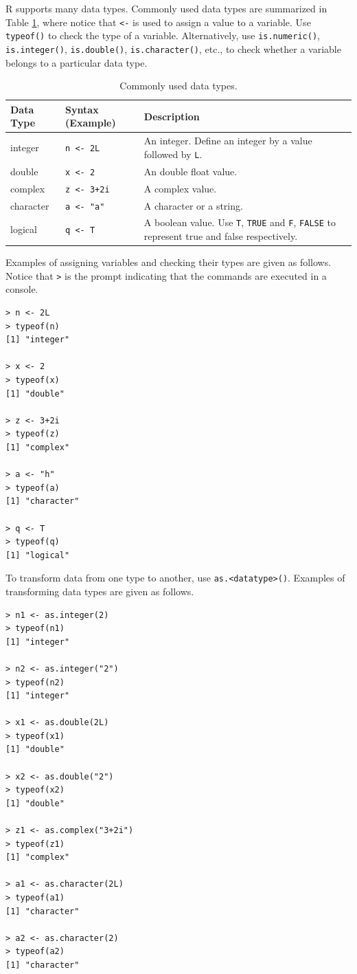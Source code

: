 R supports many data types. Commonly used data types are summarized in Table \ref{ch:r1:tab:datatype}, where notice that \verb|<-| is used to assign a value to a variable. Use \verb|typeof()| to check the type of a variable. Alternatively, use \verb|is.numeric()|, \verb|is.integer()|, \verb|is.double()|, \verb|is.character()|, etc., to check whether a variable belongs to a particular data type.
\begin{table}
  \centering \caption{Commonly used data types.}\label{ch:r1:tab:datatype}
  \begin{tabularx}{\textwidth}{llX}
    \hline
    Data Type & Syntax (Example) & Description \\ \hline
    integer & \verb|n <- 2L| & An integer. Define an integer by a value followed by \verb|L|. \\
    double & \verb|x <- 2| & An double float value. \\
    complex & \verb|z <- 3+2i| & A complex value. \\
    character & \verb|a <- "a"| & A character or a string. \\
    logical & \verb|q <- T| & A boolean value. Use \verb|T|, \verb|TRUE| and \verb|F|, \verb|FALSE| to represent true and false respectively. \\
    \hline
  \end{tabularx}
\end{table}

Examples of assigning variables and checking their types are given as follows. Notice that \verb|>| is the prompt indicating that the commands are executed in a console.
\begin{lstlisting}
> n <- 2L
> typeof(n)
[1] "integer"

> x <- 2
> typeof(x)
[1] "double"

> z <- 3+2i
> typeof(z)
[1] "complex"

> a <- "h"
> typeof(a)
[1] "character"

> q <- T
> typeof(q)
[1] "logical"
\end{lstlisting}

To transform data from one type to another, use \verb|as.<datatype>()|. Examples of transforming data types are given as follows.
\begin{lstlisting}
> n1 <- as.integer(2)
> typeof(n1)
[1] "integer"

> n2 <- as.integer("2")
> typeof(n2)
[1] "integer"

> x1 <- as.double(2L)
> typeof(x1)
[1] "double"

> x2 <- as.double("2")
> typeof(x2)
[1] "double"

> z1 <- as.complex("3+2i")
> typeof(z1)
[1] "complex"

> a1 <- as.character(2L)
> typeof(a1)
[1] "character"

> a2 <- as.character(2)
> typeof(a2)
[1] "character"
\end{lstlisting}


